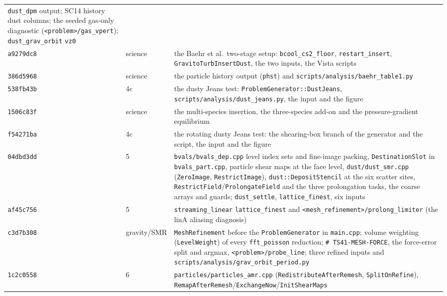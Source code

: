\documentclass[11pt]{article}
\newcommand{\code}[1]{\texttt{#1}}
\newcommand{\file}[1]{\texttt{\small #1}}
\newcommand{\fn}[1]{\texttt{\small #1}}
\begin{document}
\begin{table}[htb]
\begin{tabular}{@{}llp{9.4cm}@{}}
              \code{dust\_dpm} output; SC14 history dust columns; the seeded gas-only
              diagnostic (\code{<problem>/gas\_vpert}); \code{dust\_grav\_orbit} \code{vz0} \\
\code{a9279dc8} & science & the Baehr et al.\ two-stage setup: \code{bcool\_cs2\_floor},
              \code{restart\_insert}, \fn{GravitoTurbInsertDust}, the two inputs, the
              Vista scripts \\
\code{386d5968} & science & the particle history output (\code{phst}) and
              \file{scripts/analysis/baehr\_table1.py} \\
\code{538fb43b} & 4c & the dusty Jeans test: \fn{ProblemGenerator::DustJeans},
              \file{scripts/analysis/dust\_jeans.py}, the input and the figure \\
\code{1506c83f} & science & the multi-species insertion, the three-species add-on and
              the pressure-gradient equilibrium \\
\code{f54271ba} & 4c & the rotating dusty Jeans test: the shearing-box branch of the
              generator and the script, the input and the figure \\
\code{04dbd3dd} & 5 & \file{bvals/bvals\_dep.cpp} level index sets and fine-image packing,
              \fn{DestinationSlot} in \file{bvals\_part.cpp}, particle shear maps at the
              face level, \file{dust/dust\_smr.cpp} (\fn{ZeroImage},
              \fn{RestrictImage}), \fn{dust::DepositStencil} at the six scatter sites,
              \fn{RestrictField}/\fn{ProlongateField} and the three prolongation tasks,
              the coarse arrays and guards; \code{dust\_settle}, \code{lattice\_finest},
              six inputs \\
\code{af45c756} & 5 & \code{streaming\_linear} \code{lattice\_finest} and
              \code{<mesh\_refinement>/prolong\_limiter} (the linA aliasing diagnosis) \\
\code{c3d7b308} & gravity/SMR & \code{MeshRefinement} before the \code{ProblemGenerator}
              in \file{main.cpp}; volume weighting (\fn{LevelWeight}) of every
              \code{fft\_poisson} reduction; \code{\# TS41-MESH-FORCE}, the force-error
              split and argmax, \code{<problem>/probe\_line}; three refined inputs and
              \file{scripts/analysis/grav\_orbit\_period.py} \\
\code{1c2c0558} & 6 & \file{particles/particles\_amr.cpp} (\fn{RedistributeAfterRemesh},
              \fn{SplitOnRefine}), \fn{RemapAfterRemesh}/\fn{ExchangeNow}/\fn{InitShearMaps}

\end{tabular}
\end{table}
\end{document}
